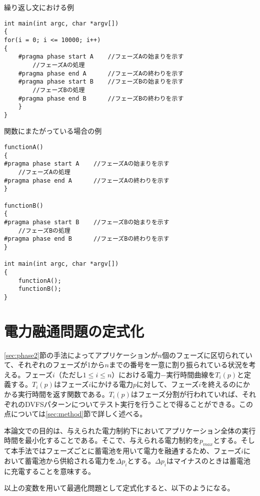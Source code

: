 {\small
\begin{itembox}[c]{繰り返し文における例}
\begin{verbatim}
int main(int argc, char *argv[])
{
for(i = 0; i <= 10000; i++)
{
    #pragma phase start A    //フェーズAの始まりを示す
        //フェーズAの処理
    #pragma phase end A      //フェーズAの終わりを示す
    #pragma phase start B    //フェーズBの始まりを示す
        //フェーズBの処理
    #pragma phase end B      //フェーズBの終わりを示す
    }
}
\end{verbatim}
\end{itembox}}

{\small
\begin{itembox}[c]{関数にまたがっている場合の例}
\begin{verbatim}
functionA()
{
#pragma phase start A    //フェーズAの始まりを示す
    //フェーズAの処理
#pragma phase end A      //フェーズAの終わりを示す
}

functionB()
{
#pragma phase start B    //フェーズBの始まりを示す
    //フェーズBの処理
#pragma phase end B      //フェーズBの終わりを示す
}

int main(int argc, char *argv[])
{
    functionA();
    functionB();
}
\end{verbatim}
\end{itembox}}


\section{電力融通問題の定式化}
\label{sec:formularization}

\ref{sec:phase2}節の手法によってアプリケーションが$n$個のフェーズに区切られていて、それぞれのフェーズが1から$n$までの番号を一意に割り振られている状況を考える。フェーズ$i$（ただし$1\leq i\leq n$）における電力−実行時間曲線を$T_i(p)$と定義する。$T_i(p)$はフェーズ$i$にかける電力$p$に対して、フェーズ$i$を終えるのにかかる実行時間を返す関数である。$T_i(p)$はフェーズ分割が行われていれば、それぞれのDVFSパターンについてテスト実行を行うことで得ることができる。この点については\ref{sec:method}節で詳しく述べる。

本論文での目的は、与えられた電力制約下においてアプリケーション全体の実行時間を最小化することである。そこで、与えられる電力制約を$p_{max}$とする。そして本手法ではフェーズごとに蓄電池を用いて電力を融通するため、フェーズ$i$において蓄電池から供給される電力を$\Delta p_i$とする。$\Delta p_i$はマイナスのときは蓄電池に充電することを意味する。

以上の変数を用いて最適化問題として定式化すると、以下のようになる。

